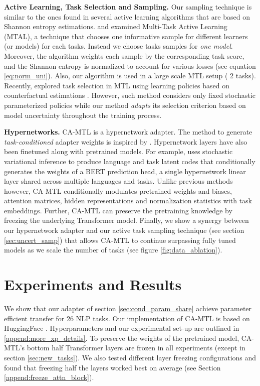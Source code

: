\documentclass{article} \usepackage{iclr2021_conference,times}
\begin{document}
\textbf{Active Learning, Task Selection and Sampling.}
Our sampling technique is similar to the ones found in several active learning algorithms \citep{chen-etal-2006-empirical-study} that are based on Shannon entropy estimations. \citet{reichart2008multi} and \citet{ikhwantri2018multi} examined Multi-Task Active Learning (MTAL), a technique that chooses one informative sample for  different learners (or models) for each  tasks. Instead we choose  tasks samples for \emph{one model}.
Moreover, the algorithm weights each sample by the corresponding task score, and the Shannon entropy is normalized to account for various losses (see equation \ref{eq:norm_uni}). Also, our algorithm is used in a large scale MTL setup ( 2 tasks). Recently, \citet{DBLP:journals/corr/abs-1907-06214}  explored task selection in MTL using learning policies based on counterfactual estimations \citep{charles2013counterfactual}. However, such method considers only fixed stochastic parameterized policies while our method \emph{adapts} its selection criterion based on model uncertainty throughout the training process.

\textbf{Hypernetworks.}
CA-MTL is a hypernetwork adapter. The method to generate \emph{task-conditioned} adapter weights is inspired by \cite{Oswald2020Continual}. Hypernetwork layers have also been finetuned along with pretrained models. For example, \cite{ponti-etal-2021-parameter} uses stochastic variational inference \cite{JMLR:v14:hoffman13a} to produce language and task latent codes that conditionally generates the weights of a BERT prediction head, a single hypernetwork linear layer shared across multiple languages and tasks.  Unlike previous methods however, CA-MTL conditionally modulates pretrained weights and biases, attention matrices, hidden representations and normalization statistics with task embeddings. Further, CA-MTL can preserve the pretraining knowledge by freezing the underlying Transformer model. Finally, we show a synergy between our hypernetwork adapter and our active task sampling technique (see section \ref{sec:uncert_samp}) that allows CA-MTL to continue surpassing fully tuned models as we scale the number of tasks (see figure \ref{fig:data_ablation}).

\section{Experiments and Results}

We show that our adapter of section \ref{sec:cond_param_share} achieve parameter efficient transfer for 26 NLP tasks. 
Our implementation of CA-MTL is based on HuggingFace \citep{huggingface}. Hyperparameters and our experimental set-up are outlined in \ref{append:more_xp_details}. To preserve the weights of the pretrained model, CA-MTL's bottom half Transformer layers are frozen in all experiments (except in section \ref{sec:new_tasks}). We also tested different layer freezing configurations and found that freezing half the layers worked best on average (see Section \ref{append:freeze_attn_block}).
\end{document}
